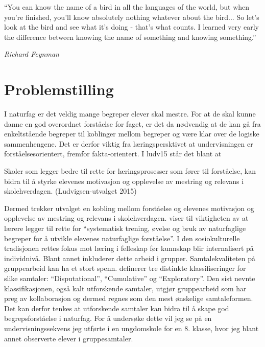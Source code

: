 \documentclass[main.tex]{subfiles}
\begin{document}
\setlength{\epigraphwidth}{0.8\textwidth}
\epigraph{``You can know the name of a bird in all the languages of the world, 
but when you're finished, you'll know absolutely nothing whatever about the bird...
So let's look at the bird and see what it’s doing - that's what counts. I learned 
very early the difference between knowing the name of something and knowing something.''}
{\textit{Richard Feynman}}

\section*{Problemstilling}

I naturfag er det veldig mange begreper elever skal mestre. For at de skal kunne danne en god 
overordnet forståelse for faget, er det da nødvendig at de kan gå fra enkeltstående begreper til 
koblinger mellom begreper og være klar over de logiske sammenhengene. Det er derfor viktig fra 
læringspersktivet at undervisningen er forståelsesorientert, fremfor fakta-orientert. I \citeA
{ludv15} står det blant at
\begin{displayquote}
Skoler som legger bedre til rette for læringsprosesser som fører til forståelse, kan bidra til å 
styrke elevenes motivasjon og opplevelse av mestring og relevans i skolehverdagen. 
(Ludvigsen-utvalget 2015)
\end{displayquote}
Dermed trekker utvalget en kobling mellom forståelse og elevenes motivasjon og opplevelse av
mestring og relevans i skolehverdagen.  viser til viktigheten av at 
lærere legger til rette for ``systematisk trening, øvelse og bruk av naturfaglige begreper 
for å utvikle elevenes naturfaglige forståelse''. I den sosiokulturelle tradisjonen rettes 
fokus mot læring i felleskap før kunnskap blir internalisert på individnivå. Blant annet 
inkluderer dette arbeid i grupper. Samtalekvaliteten på gruppearbeid kan ha et stort spenn. 
 definerer tre distinkte klassifiseringer for slike samtaler:
``Disputational'', ``Cumulative'' og ``Exploratory''. Den sist nevnte klassifikasjonen,
også kalt utforskende samtaler, utgjør gruppearbeid som har preg av kollaborasjon og dermed
regnes som den mest ønskelige samtaleformen. Det kan derfor tenkes at utforskende samtaler 
kan bidra til å skape god begrepsforståelse i naturfag. For å undersøke dette vil jeg se 
på en undervisningssekvens jeg utførte i en ungdomskole for en 8. klasse, hvor jeg blant
annet observerte elever i gruppesamtaler.
\newline
\newline
\end{document}
